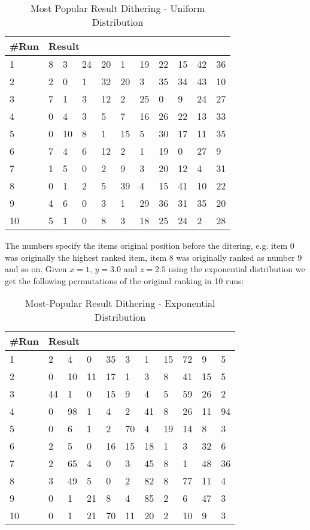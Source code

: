 \begin{table}[H]
	\centering
	\begin{tabular}{*{11}l}
	\toprule
	\multicolumn{1}{l}{\#Run} & \multicolumn{10}{l}{Result} \\ \midrule
	1 	& 8 & 3 &  24 &  20 &  1 &  19 &  22 &  15 &  42 &  36 \\
	2 	& 2 &  0 &  1 &  32 &  20 &  3 &  35 &  34 &  43 &  10 \\
	3	& 7 &  1 &  3 &  12 &  2 &  25 &  0 &  9 &  24 &  27\\
	4	& 0 &  4 &  3 &  5 &  7 &  16 &  26 &  22 &  13 &  33\\
	5	& 0 &  10 &  8 &  1 &  15 &  5 &  30 &  17 &  11 &  35\\
	6	& 7 &  4 &  6 &  12 &  2 &  1 &  19 &  0 &  27 &  9\\
	7	& 1 &  5 &  0 &  2 &  9 &  3 &  20 &  12 &  4 &  31\\
	8	& 0 &  1 &  2 &  5 &  39 &  4 &  15 &  41 &  10 &  22\\
	9	& 4 &  6 &  0 &  3 &  1 &  29 &  36 &  31 &  35 &  20\\
	10	& 5 &  1 &  0 &  8 &  3 &  18 &  25 & 24 & 2 & 28\\
	\bottomrule
\end{tabular}
\caption{Most Popular Result Dithering - Uniform Distribution}
\end{table}

The numbers specify the items original position before the ditering, e.g. item 0 was originally
the highest ranked item, item 8 was originally ranked as number 9 and so on. Given $x=1$, $y=3.0$
and $z=2.5$ using the exponential distribution we get the following permutations of the original
ranking in 10 runs:

\begin{table}[H]
	\centering
	\begin{tabular}{*{11}l}
	\toprule
	\multicolumn{1}{l}{\#Run} & \multicolumn{10}{l}{Result} \\ \midrule
	1	& 2 &  4 &  0 &  35 &  3 &  1 &  15 &  72 &  9 &  5\\
	2	& 0 &  10 &  11 &  17 &  1 &  3 &  8 &  41 &  15 &  5\\
	3	& 44 &  1 &  0 &  15 &  9 &  4 &  5 &  59 &  26 &  2\\
	4	& 0 &  98 &  1 &  4 &  2 &  41 &  8 &  26 &  11 &  94\\
	5	& 0 &  6 &  1 &  2 &  70 &  4 &  19 &  14 &  8 &  3\\
	6	& 2 &  5 &  0 &  16 &  15 &  18 &  1 &  3 &  32 &  6\\
	7	& 2 &  65 &  4 &  0 &  3 &  45 &  8 &  1 &  48 &  36\\
	8	& 3 &  49 &  5 &  0 &  2 &  82 &  8 &  77 &  11 &  4\\
	9	& 0 &  1 &  21 &  8 &  4 &  85 &  2 &  6 &  47 &  3\\
	10	& 0 &  1 &  21 &  70 &  11 &  20 &  2 & 10 & 9& 3 \\
	\bottomrule
\end{tabular}
\caption{Most-Popular Result Dithering - Exponential Distribution}
\end{table}

